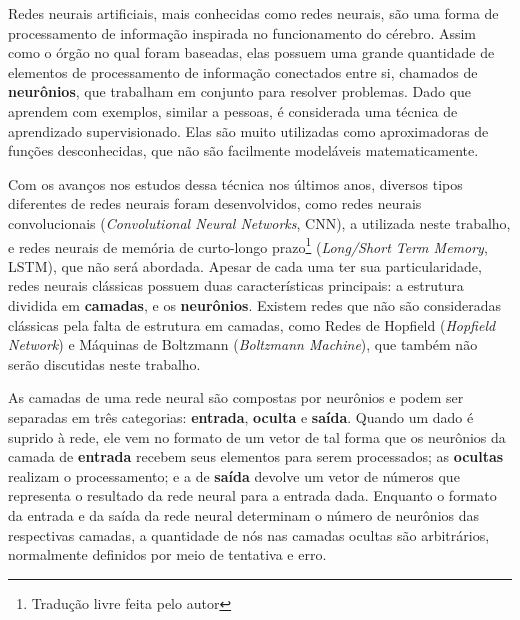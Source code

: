 
Redes neurais artificiais, mais conhecidas como redes neurais, são uma forma de processamento de informação inspirada no funcionamento do cérebro.
Assim como o órgão no qual foram baseadas, elas possuem uma grande quantidade de elementos de processamento de informação conectados entre si, chamados de \textbf{neurônios}, que trabalham em conjunto para resolver problemas.
Dado que aprendem com exemplos, similar a pessoas, é considerada uma técnica de aprendizado supervisionado.
Elas são muito utilizadas como aproximadoras de funções desconhecidas, que não são facilmente modeláveis matematicamente.

Com os avanços nos estudos dessa técnica nos últimos anos, diversos tipos diferentes de redes neurais foram desenvolvidos, como redes neurais convolucionais (\textit{Convolutional Neural Networks}, CNN), a utilizada neste trabalho, e redes neurais de memória de curto-longo prazo\footnote{Tradução livre feita pelo autor} (\textit{Long/Short Term Memory}, LSTM), que não será abordada.
Apesar de cada uma ter sua particularidade, redes neurais clássicas possuem duas características principais: a estrutura dividida em \textbf{camadas}, e os \textbf{neurônios}.
Existem redes que não são consideradas clássicas pela falta de estrutura em camadas, como Redes de Hopfield (\textit{Hopfield Network}) e Máquinas de Boltzmann (\textit{Boltzmann Machine}), que também não serão discutidas neste trabalho.

As camadas de uma rede neural são compostas por neurônios e podem ser separadas em três categorias: \textbf{entrada}, \textbf{oculta} e \textbf{saída}.
Quando um dado é suprido à rede, ele vem no formato de um vetor de tal forma que os neurônios da camada de \textbf{entrada} recebem seus elementos para serem processados;
as \textbf{ocultas} realizam o processamento;
e a de \textbf{saída} devolve um vetor de números que representa o resultado da rede neural para a entrada dada.
Enquanto o formato da entrada e da saída da rede neural determinam o número de neurônios das respectivas camadas, a quantidade de nós nas camadas ocultas são arbitrários, normalmente definidos por meio de tentativa e erro.

